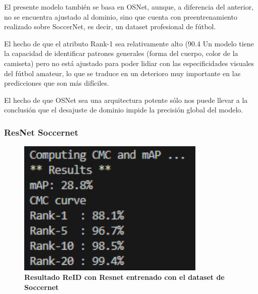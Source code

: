 \documentclass[12pt, a4paper, twoside]{article}
\begin{document}
 	El presente modelo también se basa en OSNet, aunque, a diferencia del anterior, no se encuentra ajustado al dominio, sino que cuenta con preentrenamiento realizado sobre SoccerNet, es decir, un dataset profesional de fútbol.
 	
 	El hecho de que el atributo Rank-1 sea relativamente alto (90.4%
 	Un modelo tiene la capacidad de identificar patrones generales (forma del cuerpo, color de la camiseta) pero no está ajustado para poder lidiar con las especificidades visuales del fútbol amateur, lo que se traduce en un deterioro muy importante en las predicciones que son más difíciles.
 	
 	El hecho de que OSNet sea una arquitectura potente sólo nos puede llevar a la conclusión que el desajuste de dominio impide la precisión global del modelo.
 	
 	\subsubsection{ResNet Soccernet}
 	\begin{figure}[H]
 		\centering
 		\includegraphics[width=0.8\textwidth]{image/model.resnet50.pth.tar-20_soccernet}
 		\caption{\textbf{Resultado ReID con Resnet entrenado con el dataset de Soccernet}}
 		\label{fig:Resultado  con Resnet reid soccernet resnet50_fc512}
 	\end{figure}
 	
\end{document}
